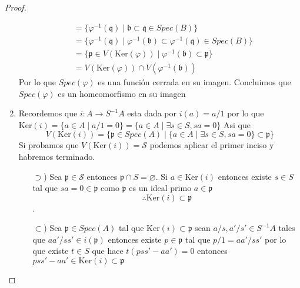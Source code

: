 \documentclass[14pt]{extarticle}
\begin{document}
\begin{proof}
\begin{enumerate}
\begin{align*}
            &=\{\varphi^{-1}(\mathfrak{q})\mid \mathfrak{b}\subset \mathfrak{q}\in Spec(B)\}\\
            &= \{\varphi^{-1}(\mathfrak{q})\mid \varphi^{-1}(\mathfrak{b}) \subset \varphi^{-1}(\mathfrak{q})\in Spec(B)\}\\
            &= \{\mathfrak{p}\in V(\mbox{Ker}(\varphi))\mid \varphi^{-1}(\mathfrak{b}) \subset \mathfrak{p}\}\\
            &= V(\mbox{Ker}(\varphi))\cap V(\varphi^{-1}(\mathfrak{b}))
        \end{align*}
        Por lo que $Spec(\varphi)$ es una función cerrada en su imagen.
        Concluimos que $Spec(\varphi)$ es un homeomorfismo en su imagen
        \item Recordemos que $i:A\rightarrow S^{-1}A$ esta dada por $i(a)=a/1$
        por lo que $\mbox{Ker}(i)=\{a\in A\mid a/1=0\}= \{a\in A\mid \exists s\in S, sa=0\}$
        Asi que 
        $$V(\mbox{Ker}(i))
        =\{\mathfrak{p}\in Spec(A)\mid \{a\in A\mid \exists s\in S, sa=0\} \subset \mathfrak{p}\}
        $$
        Si probamos que $V(\mbox{Ker}(i))=\mathcal{S}$ podemos aplicar el primer inciso y 
        habremos terminado.
        \begin{enumerate}
            \item[$\supset$)] Sea $\mathfrak{p}\in \mathcal{S}$
            entonces $\mathfrak{p}\cap S = \varnothing$.
            Si $a\in \mbox{Ker}(i)$ entonces existe $s\in S$ tal que
            $sa=0\in \mathfrak{p}$ como $\mathfrak{p}$ es un ideal primo 
            $a\in \mathfrak{p}$ 
            $$\therefore \mbox{Ker}(i)\subset \mathfrak{p}$$.
            \item[$\subset$)] Sea $\mathfrak{p}\in Spec(A)$ tal que
            $\mbox{Ker}(i)\subset \mathfrak{p}$ sean $a/s, a'/s'\in S^{-1}A$
            tales que $aa'/ss' \in i(\mathfrak{p})$ entonces existe 
            $p\in \mathfrak{p}$ tal que $p/1= aa'/ss'$ por lo que existe $t\in S$
            que hace $t(pss'-aa')=0$ entonces $pss'-aa'\in \mbox{Ker}(i)\subset \mathfrak{p}$
            

        \end{enumerate}
    \end{enumerate}
\end{proof}
\end{document}
